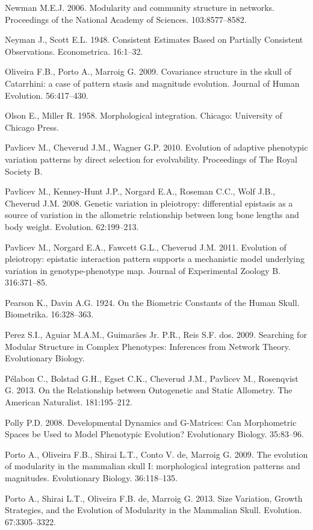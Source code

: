 \documentclass[12pt,]{article}
\begin{document}
Newman M.E.J. 2006. Modularity and community structure in networks.
Proceedings of the National Academy of Sciences. 103:8577--8582.

Neyman J., Scott E.L. 1948. Consistent Estimates Based on Partially
Consistent Observations. Econometrica. 16:1--32.

Oliveira F.B., Porto A., Marroig G. 2009. Covariance structure in the
skull of Catarrhini: a case of pattern stasis and magnitude evolution.
Journal of Human Evolution. 56:417--430.

Olson E., Miller R. 1958. Morphological integration. Chicago: University
of Chicago Press.

Pavlicev M., Cheverud J.M., Wagner G.P. 2010. Evolution of adaptive
phenotypic variation patterns by direct selection for evolvability.
Proceedings of The Royal Society B.

Pavlicev M., Kenney-Hunt J.P., Norgard E.A., Roseman C.C., Wolf J.B.,
Cheverud J.M. 2008. Genetic variation in pleiotropy: differential
epistasis as a source of variation in the allometric relationship
between long bone lengths and body weight. Evolution. 62:199--213.

Pavlicev M., Norgard E.A., Fawcett G.L., Cheverud J.M. 2011. Evolution
of pleiotropy: epistatic interaction pattern supports a mechanistic
model underlying variation in genotype-phenotype map. Journal of
Experimental Zoology B. 316:371--85.

Pearson K., Davin A.G. 1924. On the Biometric Constants of the Human
Skull. Biometrika. 16:328--363.

Perez S.I., Aguiar M.A.M., Guimarães Jr. P.R., Reis S.F. dos. 2009.
Searching for Modular Structure in Complex Phenotypes: Inferences from
Network Theory. Evolutionary Biology.

Pélabon C., Bolstad G.H., Egset C.K., Cheverud J.M., Pavlicev M.,
Rosenqvist G. 2013. On the Relationship between Ontogenetic and Static
Allometry. The American Naturalist. 181:195--212.

Polly P.D. 2008. Developmental Dynamics and G-Matrices: Can Morphometric
Spaces be Used to Model Phenotypic Evolution? Evolutionary Biology.
35:83--96.

Porto A., Oliveira F.B., Shirai L.T., Conto V. de, Marroig G. 2009. The
evolution of modularity in the mammalian skull I: morphological
integration patterns and magnitudes. Evolutionary Biology. 36:118--135.

Porto A., Shirai L.T., Oliveira F.B. de, Marroig G. 2013. Size
Variation, Growth Strategies, and the Evolution of Modularity in the
Mammalian Skull. Evolution. 67:3305--3322.
\end{document}
